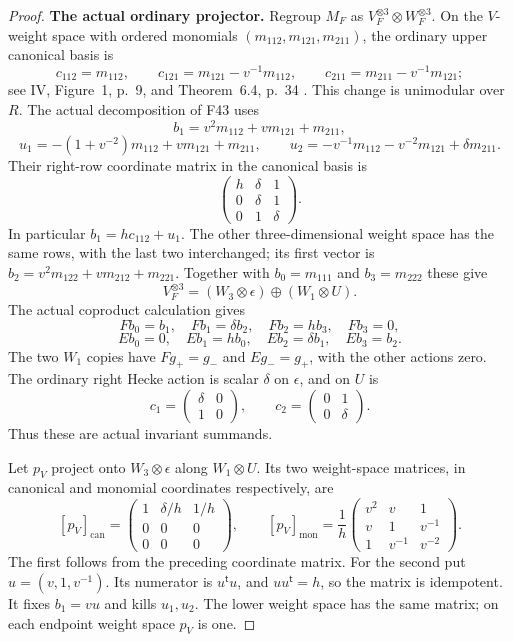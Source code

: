 \documentclass[11pt,a4paper]{article}
\newcommand{\fid}[1]{\textsf{#1}}\newcommand{\gate}[1]{\textsf{#1}}
\theoremstyle{named}\newtheorem{finding}{Finding}[section]
\theoremstyle{definition}\newtheorem{definition}[finding]{Definition}
\theoremstyle{remark}\newtheorem{remark}[finding]{Remark}
\begin{document}
\begin{proof}
\par\smallskip\noindent\textbf{The actual ordinary projector.}\quad
Regroup $M_F$ as $V_F^{\otimes3}\otimes W_F^{\otimes3}$.
On the $V$-weight space with ordered monomials
$(m_{112},m_{121},m_{211})$, the ordinary upper canonical basis is
\[
 c_{112}=m_{112},\qquad
 c_{121}=m_{121}-v^{-1}m_{112},\qquad
 c_{211}=m_{211}-v^{-1}m_{121};
\]
see IV, Figure~1, p.~9, and Theorem~6.4, p.~34 \cite{IV}.
This change is unimodular over $R$.
The actual decomposition of \fid{F43} uses
\[
 b_1=v^2m_{112}+v m_{121}+m_{211},
\]
\[
 u_1=-(1+v^{-2})m_{112}+v m_{121}+m_{211},\qquad
 u_2=-v^{-1}m_{112}-v^{-2}m_{121}+\delta m_{211}.
\]
Their right-row coordinate matrix in the canonical basis is
\[
 \begin{pmatrix}
 h&\delta&1\\
 0&\delta&1\\
 0&1&\delta
 \end{pmatrix}.
\]
In particular $b_1=h c_{112}+u_1$.
The other three-dimensional weight space has the same rows,
with the last two interchanged; its first vector is
$b_2=v^2m_{122}+v m_{212}+m_{221}$.
Together with $b_0=m_{111}$ and $b_3=m_{222}$ these give
\[
 V_F^{\otimes3}
 =(W_3\otimes\epsilon)\oplus(W_1\otimes U).
\]
The actual coproduct calculation gives
\[
 Fb_0=b_1,\quad Fb_1=\delta b_2,\quad Fb_2=h b_3,\quad Fb_3=0,
\]
\[
 Eb_0=0,\quad Eb_1=h b_0,\quad Eb_2=\delta b_1,\quad Eb_3=b_2.
\]
The two $W_1$ copies have $Fg_+=g_-$ and $Eg_-=g_+$,
with the other actions zero. The ordinary right Hecke action
is scalar $\delta$ on $\epsilon$, and on $U$ is
\[
 c_1=\begin{pmatrix}\delta&0\\1&0\end{pmatrix},
 \qquad
 c_2=\begin{pmatrix}0&1\\0&\delta\end{pmatrix}.
\]
Thus these are actual invariant summands.

Let $p_V$ project onto $W_3\otimes\epsilon$ along $W_1\otimes U$.
Its two weight-space matrices, in canonical and monomial
coordinates respectively, are
\[
 [p_V]_{\mathrm{can}}=
 \begin{pmatrix}
 1&\delta/h&1/h\\
 0&0&0\\
 0&0&0
 \end{pmatrix},
 \qquad
 [p_V]_{\mathrm{mon}}=
 \frac1h
 \begin{pmatrix}
 v^2&v&1\\
 v&1&v^{-1}\\
 1&v^{-1}&v^{-2}
 \end{pmatrix}.
\]
The first follows from the preceding coordinate matrix.
For the second put $u=(v,1,v^{-1})$.
Its numerator is $u^{\mathsf t}u$, and $u u^{\mathsf t}=h$,
so the matrix is idempotent. It fixes $b_1=v u$ and kills
$u_1,u_2$. The lower weight space has the same matrix;
on each endpoint weight space $p_V$ is one.


\end{proof}
\end{document}
